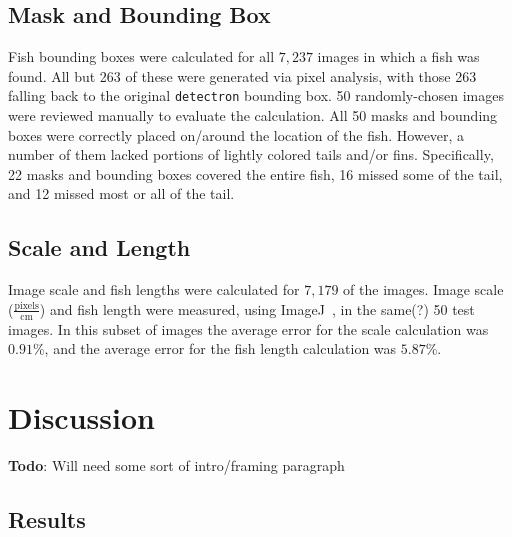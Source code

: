 \documentclass[conference]{IEEEtran}
\begin{document}
\subsection{Mask and Bounding Box}
Fish bounding boxes were calculated for all \(7,237\) images in which a fish was found. All but 263 of these were generated via pixel analysis, with those 263 falling back to the original \verb|detectron| bounding box.
50 randomly-chosen images were reviewed manually to evaluate the
calculation.  All 50 masks and bounding boxes were correctly placed
on/around the location of the fish. However, a number of them lacked portions of lightly colored tails and/or fins.
Specifically, 22 masks and bounding boxes covered the entire fish,
16 missed some of the tail, and 12 missed most or all of the tail.

\subsection{Scale and Length}
Image scale and fish lengths were calculated for \(7,179\) of the images.
Image scale ($\frac{\mathrm{pixels}}{\mathrm{cm}}$) and fish length were
measured, using ImageJ~\cite{imagejCite}, in the same(?) 50 test images.
In this subset of images the average error for the scale calculation
was \(0.91\%\), and the average error for the fish length calculation was \(5.87\%\).

\section{Discussion}
\textbf{Todo}: Will need some sort of intro/framing paragraph
\subsection{Results}
\end{document}
